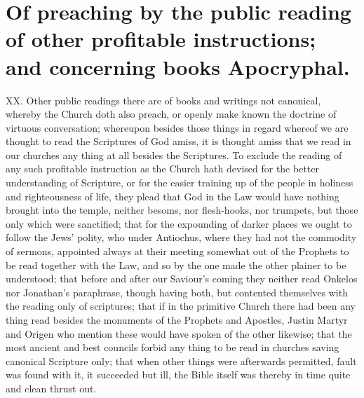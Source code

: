 \section*{Of preaching by the public reading of other profitable instructions; and concerning books Apocryphal.}
XX. Other public readings there are of books and writings not canonical, whereby the Church doth also preach, or openly  make known the doctrine of virtuous conversation; whereupon besides those things in regard whereof we are thought to read the Scriptures of God amiss, it is thought amiss that we read in our churches any thing at all besides the Scriptures. To exclude the reading of any such profitable instruction as the Church hath devised for the better understanding of Scripture, or for the easier training up of the people in holiness and righteousness of life, they plead that God in the Law would have nothing brought into the temple, neither besoms, nor flesh-hooks, nor trumpets, but those only which were sanctified; that for the expounding of darker places we ought to follow the Jews’ polity, who under Antiochus, where they  had not the commodity of sermons, appointed always at their meeting somewhat out of the Prophets to be read together with the Law, and so by the one made the other plainer to be understood; that before and after our Saviour’s coming they neither read Onkelos nor Jonathan’s paraphrase, though having both, but contented themselves with the reading only of scriptures; that if in the primitive Church there had been any thing read besides the monuments of the Prophets and Apostles, Justin Martyr and Origen who mention these would have spoken of the other likewise; that the most ancient and best councils forbid any thing to be read in churches saving canonical Scripture only; that when other things were afterwards permitted, fault was found with it, it succeeded but ill, the Bible itself was thereby in time quite and clean thrust out.
